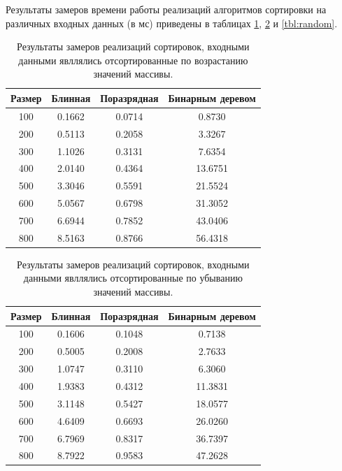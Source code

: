 Результаты замеров времени работы реализаций алгоритмов сортировки на различных входных данных (в мс) приведены в таблицах \ref{tbl:best}, \ref{tbl:worth} и \ref{tbl:random}.

\begin{table}[h]
	\begin{center}
		\begin{threeparttable}
		\captionsetup{justification=raggedleft,singlelinecheck=off}
		\caption{Результаты замеров реализаций сортировок, входными данными явллялись отсортированные по возрастанию значений массивы.}
		\label{tbl:best}
		\begin{tabular}{|c|c|c|c|}
			\hline
			Размер & Блинная &  Поразрядная &  Бинарным деревом \\
			\hline
			100 & 0.1662 & 0.0714 & 0.8730 \\ 
			\hline
			200 & 0.5113 & 0.2058 & 3.3267 \\ 
			\hline
			300 & 1.1026 & 0.3131 & 7.6354 \\ 
			\hline
			400 & 2.0140 & 0.4364 & 13.6751 \\ 
			\hline
			500 & 3.3046 & 0.5591 & 21.5524 \\ 
			\hline
			600 & 5.0567 & 0.6798 & 31.3052 \\ 
			\hline
			700 & 6.6944 & 0.7852 & 43.0406 \\ 
			\hline
			800 & 8.5163 & 0.8766 & 56.4318 \\ 
			\hline
		\end{tabular}
		\end{threeparttable}
    \end{center}
\end{table}


\begin{table}[h]
	\begin{center}
		\begin{threeparttable}
		\captionsetup{justification=raggedleft,singlelinecheck=off}
		\caption{Результаты замеров реализаций сортировок, входными данными явллялись отсортированные по убыванию значений массивы.}
		\label{tbl:worth}
		\begin{tabular}{|c|c|c|c|}
			\hline
			Размер & Блинная &  Поразрядная &  Бинарным деревом \\
			\hline
			100 & 0.1606 & 0.1048 & 0.7138 \\ 
			\hline
			200 & 0.5005 & 0.2008 & 2.7633 \\ 
			\hline
			300 & 1.0747 & 0.3110 & 6.3060 \\ 
			\hline
			400 & 1.9383 & 0.4312 & 11.3831 \\ 
			\hline
			500 & 3.1148 & 0.5427 & 18.0577 \\ 
			\hline
			600 & 4.6409 & 0.6693 & 26.0260 \\ 
			\hline
			700 & 6.7969 & 0.8317 & 36.7397 \\ 
			\hline
			800 & 8.7922 & 0.9583 & 47.2628 \\ 
			\hline
		\end{tabular}
		\end{threeparttable}
    \end{center}
\end{table}


